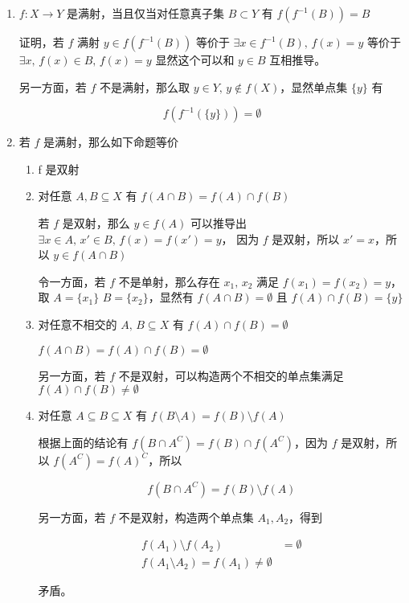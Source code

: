 \documentclass[12pt,a4paper]{ctexart}
\begin{document}
\begin{enumerate}
    \item $f: X \to Y$ 是满射，当且仅当对任意真子集 $B \subset Y$ 有 $f(f^{-1}(B)) = B$

    证明，若 $f$ 满射 $y \in f(f^{-1}(B))$ 等价于 $\exists x \in f^{-1}(B),\, f(x) = y$
    等价于 $\exists x,\, f(x) \in B,\, f(x) = y$ 显然这个可以和 $y \in B$ 互相推导。

    另一方面，若 $f$ 不是满射，那么取 $y \in Y,\, y \notin f(X)$，显然单点集 $\{ y \}$ 有

    \[
        f(f^{-1}(\{ y \})) = \emptyset
    \]

    \item 若 $f$ 是满射，那么如下命题等价

    \begin{enumerate}
        \item f 是双射
        \item 对任意 $A, B \subseteq X$ 有 $f(A \cap B) = f(A) \cap f(B)$

        若 $f$ 是双射，那么 $y \in f(A)$ 可以推导出 $\exists x \in A,\, x' \in B,\, f(x) = f(x') = y$，
        因为 $f$ 是双射，所以 $x' = x $，所以 $y \in f(A \cap B)$

        令一方面，若 $f$ 不是单射，那么存在 $x_1,\, x_2$ 满足 $f(x_1) = f(x_2) = y$，取 $A = \{ x_1 \}$
        $B = \{ x_2 \}$，显然有 $f(A \cap B) = \emptyset$ 且 $f(A) \cap f(B) = \{ y \}$

        \item 对任意不相交的 $A,\, B \subseteq X$ 有 $f(A) \cap f(B) = \emptyset$

        $f(A \cap B) = f(A) \cap f(B) = \emptyset$


        另一方面，若 $f$ 不是双射，可以构造两个不相交的单点集满足 $f(A) \cap f(B) \ne \emptyset$

        \item 对任意 $A \subseteq B \subseteq X$ 有 $f(B \setminus A) = f(B) \setminus f(A)$

        根据上面的结论有 $f(B \cap A^C) = f(B) \cap f(A^C)$，因为 $f$ 是双射，所以 $f(A^C) = f(A)^C$，所以

        \[
        f(B \cap A^C) = f(B) \setminus f(A)
        \]

        另一方面，若 $f$ 不是双射，构造两个单点集 $A_1, A_2$，得到

        \begin{align*}
            f(A_1) \setminus f(A_2) &= \emptyset \\
            f(A_1 \setminus A_2) = f(A_1) \ne \emptyset
        \end{align*}

        矛盾。

    \end{enumerate}
\end{enumerate}
\end{document}
